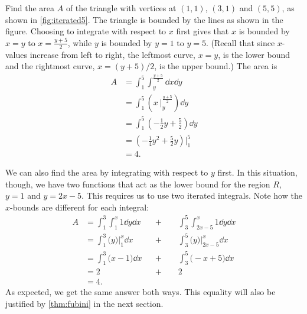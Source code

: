 \begin{example}\label{ex_iterated5}
Find the area $A$ of the triangle with vertices at $(1,1)$, $(3,1)$ and $(5,5)$, as shown in \autoref{fig:iterated5}.
%
\solution
The triangle is bounded by the lines as shown in the figure. Choosing to integrate with respect to $x$ first gives that $x$ is bounded by $x=y$ to $x = \frac{y+5}2$, while $y$ is bounded by $y=1$ to $y=5$. (Recall that since $x$-values increase from left to right, the leftmost curve, $x=y$, is the lower bound and the rightmost curve, $x=(y+5)/2$, is the upper bound.) The area is
\begin{align*}
A &= \int_1^5\int_{y}^{\frac{y+5}2}\dd x\dd y \\
 &= \int_1^5\left(x\ \Big|_y^{\frac{y+5}2}\right)\dd y \\
&= \int_1^5 \left(-\frac12y+\frac52\right)\dd y \\
&= \left(-\frac14y^2+\frac52y\right)\Big|_1^5\\
&=4.
\end{align*}

We can also find the area by integrating with respect to $y$ first. In this situation, though, we have two functions that act as the lower bound for the region $R$, $y=1$ and $y=2x-5$. This requires us to use two iterated integrals. Note how the $x$-bounds are different for each integral:
\begin{align*}
 A
 &= \int_1^3\int_1^x 1\dd y \dd x &&+\qquad\int_3^5\int_{2x-5}^x1\dd y\dd x\\
 &= \int_1^3\bigl(y\bigr)\Big|_1^x\dd x &&+\qquad\int_3^5\bigl(y\bigr)\Big|_{2x-5}^x\dd x\\
 &= \int_1^3\bigl(x-1\bigr)\dd x &&+\qquad\int_3^5\bigl(-x+5\bigr)\dd x \\
 &= 2 &&+\qquad2 \\
 &=4.
\end{align*}
As expected, we get the same answer both ways.  This equality will also be justified by \autoref{thm:fubini} in the next section.
\end{example}

